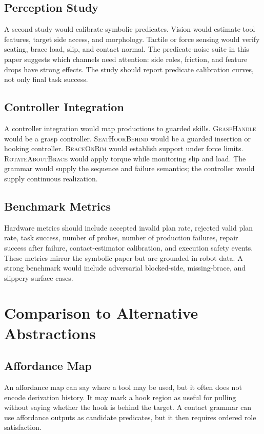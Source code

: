 \documentclass{article}
\begin{document}
\subsection{Perception Study}

A second study would calibrate symbolic predicates. Vision would estimate tool features, target side access, and morphology. Tactile or force sensing would verify seating, brace load, slip, and contact normal. The predicate-noise suite in this paper suggests which channels need attention: side roles, friction, and feature drops have strong effects. The study should report predicate calibration curves, not only final task success.

\subsection{Controller Integration}

A controller integration would map productions to guarded skills. \textsc{GraspHandle} would be a grasp controller. \textsc{SeatHookBehind} would be a guarded insertion or hooking controller. \textsc{BraceOnRim} would establish support under force limits. \textsc{RotateAboutBrace} would apply torque while monitoring slip and load. The grammar would supply the sequence and failure semantics; the controller would supply continuous realization.

\subsection{Benchmark Metrics}

Hardware metrics should include accepted invalid plan rate, rejected valid plan rate, task success, number of probes, number of production failures, repair success after failure, contact-estimator calibration, and execution safety events. These metrics mirror the symbolic paper but are grounded in robot data. A strong benchmark would include adversarial blocked-side, missing-brace, and slippery-surface cases.

\section{Comparison to Alternative Abstractions}

\subsection{Affordance Map}

An affordance map can say where a tool may be used, but it often does not encode derivation history. It may mark a hook region as useful for pulling without saying whether the hook is behind the target. A contact grammar can use affordance outputs as candidate predicates, but it then requires ordered role satisfaction.
\end{document}
